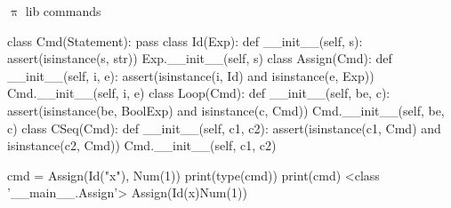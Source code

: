 \documentclass{beamer}
\begin{document}
\begin{frame}{{\color{red}$\uppi$ lib} commands}

\begin{adjustbox}{width=0.8\textwidth}
\begin{python}
class Cmd(Statement): pass
class Id(Exp):
    def __init__(self, s):
        assert(isinstance(s, str))
        Exp.__init__(self, s)
class Assign(Cmd):
    def __init__(self, i, e): 
        assert(isinstance(i, Id) and isinstance(e, Exp))
        Cmd.__init__(self, i, e)
class Loop(Cmd):
    def __init__(self, be, c):
        assert(isinstance(be, BoolExp) and isinstance(c, Cmd))
        Cmd.__init__(self, be, c)
class CSeq(Cmd):
    def __init__(self, c1, c2):
        assert(isinstance(c1, Cmd) and isinstance(c2, Cmd))
        Cmd.__init__(self, c1, c2)
\end{python}
\end{adjustbox}

\framebreak
        
\begin{python}
cmd = Assign(Id("x"), Num(1))
print(type(cmd))
print(cmd)
<class '__main__.Assign'>
Assign(Id(x)Num(1))
\end{python}
\end{frame}

\end{document}
